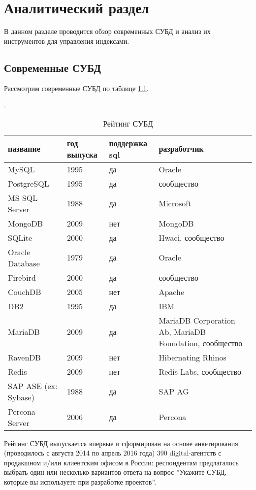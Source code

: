 \chapter{Аналитический раздел}

В данном разделе проводится обзор современных СУБД и анализ их инструментов для управления индексами.

\section{Современные СУБД}

Рассмотрим современные СУБД по таблице \ref{table:list_dbms}.

\begin{table}[h]
\caption{Рейтинг СУБД}\label{table:list_dbms}.
\medskip
\begin{tabular}{|l|p{1.5cm}|p{2cm}|p{7cm}|}
\hline
название & год выпуска & поддержка sql & разработчик\\
\hline
MySQL & 1995 & да & Oracle\\
PostgreSQL & 1995 & да & сообщество\\
MS SQL Server & 1988 & да & Microsoft\\
MongoDB & 2009 & нет & MongoDB\\
SQLite & 2000 & да & Hwaci, сообщество\\
Oracle Database & 1979 & да & Oracle\\
Firebird & 2000 & да & сообщество\\
CouchDB & 2005 & нет & Apache\\
DB2 & 1995 & да & IBM\\
MariaDB & 2009 & да & MariaDB Corporation Ab, MariaDB Foundation, сообщество\\
RavenDB & 2009 & нет & Hibernating Rhinos\\
Redis & 2009 & нет & Redis Labs, сообщество\\
SAP ASE (ex: Sybase) & 1988 & да & SAP AG\\
Percona Server & 2006 & да & Percona\\
\hline
\end{tabular}
\end{table}

Рейтинг СУБД выпускается впервые и сформирован на основе анкетирования (проводилось с августа 2014 по апрель 2016 года) 390 digital-агентств с продакшном и/или клиентским офисом в России: респондентам предлагалось выбрать один или несколько вариантов ответа на вопрос ''Укажите СУБД, которые вы используете при разработке проектов''. \cite{tagline.ru:List_DBMS}

